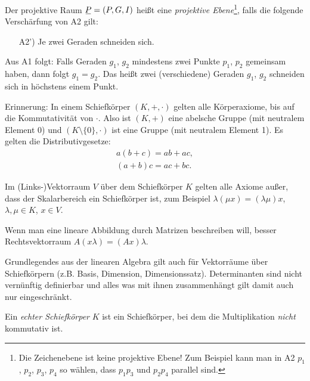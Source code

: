 \begin{defn*}
 Der projektive Raum $\proj = (P,G,I)$ heißt eine \emph{projektive Ebene}\footnote{Die Zeichenebene ist keine projektive Ebene! Zum Beispiel kann man in A2 $p_1$, $p_2$, $p_3$, $p_4$ so wählen, dass $p_1 p_3$ und $p_2 p_4$ parallel sind.}, falls die folgende Verschärfung von A2 gilt:
 \begin{enumerate}[\hspace{.5cm}{A}1)]
  \item [A2')] Je zwei Geraden schneiden sich.
 \end{enumerate}
\end{defn*}

\begin{bem}
 Aus A1 folgt: Falls Geraden $g_1$, $g_2$ mindestens zwei Punkte $p_1$, $p_2$ gemeinsam haben, dann folgt $g_1 = g_2$. Das heißt zwei (verschiedene) Geraden $g_1$, $g_2$ schneiden sich in höchstens einem Punkt.
\end{bem}

Erinnerung: In einem Schiefkörper $(K, +, \cdot)$ gelten alle Körperaxiome, bis auf die Kommutativität von $\cdot$. Also ist $(K, +)$ eine abelsche Gruppe (mit neutralem Element $0$) und $(K \setminus \{ 0 \}, \cdot)$ ist eine Gruppe (mit neutralem Element 1). Es gelten die Distributivgesetze:
\begin{align*}
 a(b+c) = ab + ac, \\
 (a+b)c = ac + bc.
\end{align*}

Im (Links-)Vektorraum $V$ über dem Schiefkörper $K$ gelten alle Axiome außer, dass der Skalarbereich ein Schiefkörper ist, zum Beispiel $\lambda( \mu x ) = (\lambda \mu) x$, $\lambda, \mu \in K$, $x \in V$.

Wenn man eine lineare Abbildung durch Matrizen beschreiben will, besser Rechtsvektorraum $A(x\lambda) = (Ax) \lambda$.

\begin{bem}
 Grundlegendes aus der linearen Algebra gilt auch für Vektorräume über Schiefkörpern (z.B. Basis, Dimension, Dimensionssatz). Determinanten sind nicht vernünf\-tig definierbar und alles was mit ihnen zusammenhängt gilt damit auch nur eingeschränkt.
\end{bem}

\begin{defn*}
 Ein \emph{echter Schiefkörper} $K$ ist ein Schiefkörper, bei dem die Multiplikation \emph{nicht} kommutativ ist.
\end{defn*}

